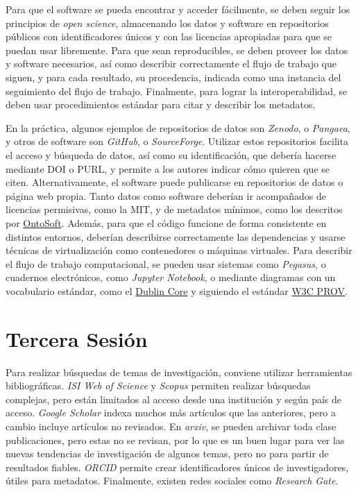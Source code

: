 \documentclass{article}
\begin{document}
Para que el software se pueda encontrar y acceder fácilmente, se deben seguir los principios de \emph{open science}, almacenando los datos y software en repositorios públicos con identificadores únicos y con las licencias apropiadas para que se puedan usar libremente. Para que sean reproducibles, se deben proveer los datos y software necesarios, así como describir correctamente el flujo de trabajo que siguen, y para cada resultado, su procedencia, indicada como una instancia del seguimiento del flujo de trabajo. Finalmente, para lograr la interoperabilidad, se deben usar procedimientos estándar para citar y describir los metadatos.

En la práctica, algunos ejemplos de repositorios de datos son \emph{Zenodo}, o \emph{Pangaea}, y otros de software son \emph{GitHub}, o \emph{SourceForge}. Utilizar estos repositorios facilita el acceso y búsqueda de datos, así como su identificación, que debería hacerse mediante DOI o PURL, y permite a los autores indicar cómo quieren que se citen. Alternativamente, el software puede publicarse en repositorios de datos o página web propia. Tanto datos como software deberían ir acompañados de licencias permisivas, como la MIT, y de metadatos mínimos, como los descritos por \href{http://www.ontosoft.org/software}{OntoSoft}. Además, para que el código funcione de forma consistente en distintos entornos, deberían describirse correctamente las dependencias y usarse técnicas de virtualización como contenedores o máquinas virtuales. Para describir el flujo de trabajo computacional, se pueden usar sistemas como \emph{Pegasus}, o cuadernos electrónicos, como \emph{Jupyter Notebook}, o mediante diagramas con un vocabulario estándar, como el \href{https://es.wikipedia.org/wiki/Dublin_Core}{Dublin Core} y siguiendo el estándar \href{https://www.w3.org/TR/prov-overview/}{W3C PROV}.

\section{Tercera Sesión}

Para realizar búsquedas de temas de investigación, conviene utilizar herramientas bibliográficas. \emph{ISI Web of Science} y \emph{Scopus} permiten realizar búsquedas complejas, pero están limitados al acceso desde una institución y según país de acceso. \emph{Google Scholar} indexa muchos más artículos que las anteriores, pero a cambio incluye artículos no revisados. En \emph{arxiv}, se pueden archivar toda clase publicaciones, pero estas no se revisan, por lo que es un buen lugar para ver las nuevas tendencias de investigación de algunos temas, pero no para partir de resultados fiables. \emph{ORCID} permite crear identificadores únicos de investigadores, útiles para metadatos. Finalmente, existen redes sociales como \emph{Research Gate}.
\end{document}
